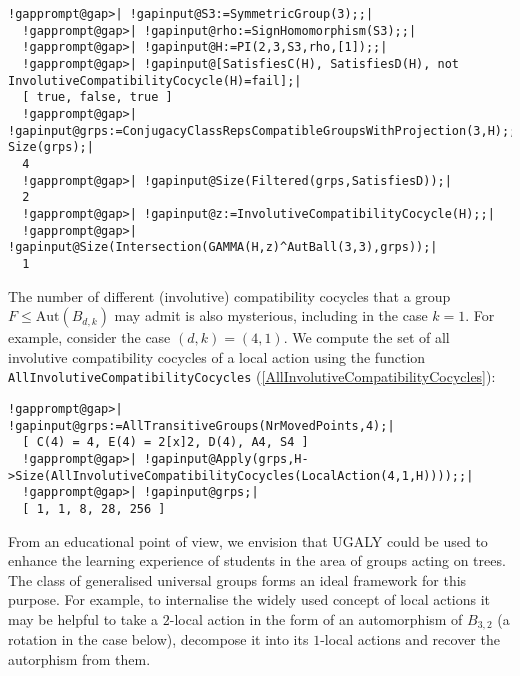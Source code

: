 \documentclass[a4paper,11pt]{report}
\begin{document}
{{ 
\begin{Verbatim}[commandchars=!@|,fontsize=\small,frame=single,label=Example]
  !gapprompt@gap>| !gapinput@S3:=SymmetricGroup(3);;|
  !gapprompt@gap>| !gapinput@rho:=SignHomomorphism(S3);;|
  !gapprompt@gap>| !gapinput@H:=PI(2,3,S3,rho,[1]);;|
  !gapprompt@gap>| !gapinput@[SatisfiesC(H), SatisfiesD(H), not InvolutiveCompatibilityCocycle(H)=fail];|
  [ true, false, true ]
  !gapprompt@gap>| !gapinput@grps:=ConjugacyClassRepsCompatibleGroupsWithProjection(3,H);; Size(grps);|
  4
  !gapprompt@gap>| !gapinput@Size(Filtered(grps,SatisfiesD));|
  2
  !gapprompt@gap>| !gapinput@z:=InvolutiveCompatibilityCocycle(H);;|
  !gapprompt@gap>| !gapinput@Size(Intersection(GAMMA(H,z)^AutBall(3,3),grps));|
  1
\end{Verbatim}
 The number of different (involutive) compatibility cocycles that a group $F\le\mathrm{Aut}(B_{d,k})$ may admit is also mysterious, including in the case $k=1$. For example, consider the case $(d,k)=(4,1)$. We compute the set of all involutive compatibility cocycles of a local
action using the function \texttt{AllInvolutiveCompatibilityCocycles} (\ref{AllInvolutiveCompatibilityCocycles}): 

 
\begin{Verbatim}[commandchars=!@|,fontsize=\small,frame=single,label=Example]
  !gapprompt@gap>| !gapinput@grps:=AllTransitiveGroups(NrMovedPoints,4);|
  [ C(4) = 4, E(4) = 2[x]2, D(4), A4, S4 ]
  !gapprompt@gap>| !gapinput@Apply(grps,H->Size(AllInvolutiveCompatibilityCocycles(LocalAction(4,1,H))));;|
  !gapprompt@gap>| !gapinput@grps;|
  [ 1, 1, 8, 28, 256 ]
\end{Verbatim}
 From an educational point of view, we envision that \textsf{UGALY} could be used to enhance the learning experience of students in the area of
groups acting on trees. The class of generalised universal groups forms an
ideal framework for this purpose. For example, to internalise the widely used
concept of local actions it may be helpful to take a $2$-local action in the form of an automorphism of $B_{3,2}$ (a rotation in the case below), decompose it into its $1$-local actions and recover the autorphism from them. 

}}
\end{document}
